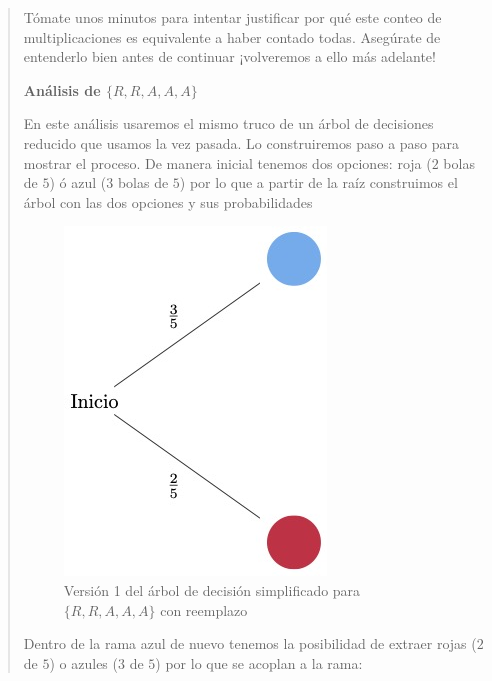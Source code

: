 \documentclass[
]{book}
\begin{document}
\begin{quote}
Tómate unos minutos para intentar justificar por qué este conteo de multiplicaciones es equivalente a haber contado todas. Asegúrate de entenderlo bien antes de continuar ¡volveremos a ello más adelante!

\textbf{Análisis de \(\{ R, R, A, A, A\}\)}

En este análisis usaremos el mismo truco de un árbol de decisiones reducido que usamos la vez pasada. Lo construiremos paso a paso para mostrar el proceso. De manera inicial tenemos dos opciones: roja (\(2\) bolas de \(5\)) ó azul (\(3\) bolas de \(5\)) por lo que a partir de la raíz construimos el árbol con las dos opciones y sus probabilidades

\begin{figure}
\centering
\includegraphics{./images/arbol_decision_3_1.jpeg}
\caption{Versión 1 del árbol de decisión simplificado para \(\{ R, R, A, A, A\}\) con reemplazo}
\end{figure}

Dentro de la rama azul de nuevo tenemos la posibilidad de extraer rojas (\(2\) de \(5\)) o azules (\(3\) de \(5\)) por lo que se acoplan a la rama:


\end{quote}
\end{document}
